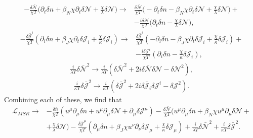 \documentclass[aps,prd,nofootinbib,amsmath,amssymb,showpacs,longbibliography,singlecolumn,superscriptaddress,notitlepage]{revtex4-1}
\theoremstyle{plain}
\theoremstyle{definition}
\begin{document}
\begin{equation}
\begin{split}
    - \frac{\delta \bar{\mathcal{N}}}{\chi T} \bigg( \partial_t \delta n + \beta_N \chi \partial_t \delta \mathcal{N} + \frac{\chi}{\lambda} \delta \mathcal{N} \bigg) \rightarrow & \frac{\delta \bar{\mathcal{N}}}{\chi T} \bigg( -\partial_t \delta n - \beta_N \chi \partial_t \delta \mathcal{N} + \frac{\chi}{\lambda} \delta \mathcal{N} \bigg) + \\
    & - \frac{i\delta \mathcal{N}}{\chi T} \bigg( \partial_t \delta n - \frac{\chi}{\lambda} \delta \mathcal{N} \bigg) ,
\end{split}
\end{equation}
\begin{equation}
\begin{split}
    - \frac{\delta \bar{\mathcal{J}}^i}{\chi T} \left( \partial_i \delta n + \beta_J \chi \partial_t \delta \mathcal{J}_i + \frac{\chi}{\kappa} \delta \mathcal{J}_i \right) \rightarrow & \frac{\delta \bar{\mathcal{J}}^i}{\chi T} \left( -\partial_i \delta n - \beta_J \chi \partial_t \delta \mathcal{J}_i + \frac{\chi}{\kappa} \delta \mathcal{J}_i \right) + \\
    & - \frac{i \delta \mathcal{J}^i}{\chi T} \left( \partial_i \delta n - \frac{\chi}{\kappa} \delta \mathcal{J}_i \right) ,
\end{split}
\end{equation}
\begin{eqnarray}
    \frac{i}{\lambda T} \delta \bar{\mathcal{N}}^2 \rightarrow \frac{i}{\lambda T} \left( \delta \bar{\mathcal{N}}^2 + 2i \delta \bar{\mathcal{N}} \delta \mathcal{N} - \delta \mathcal{N}^2 \right) ,
\end{eqnarray}
\begin{eqnarray}
    \frac{i}{\kappa T} \delta \bar{\mathcal{J}}^2 \rightarrow \frac{i}{\kappa T} \left( \delta \bar{\mathcal{J}}^2 + 2i \delta \bar{\mathcal{J}}_i \delta \mathcal{J}^i - \delta \mathcal{J}^2 \right) .
\end{eqnarray}
Combining each of these, we find that 
\begin{equation}
\begin{split}
    \mathcal{L}_{MSR} \rightarrow & - \frac{\delta \bar{n}}{\chi T} \left( u^{\mu} \partial_{\mu} \delta n + u^{\mu} \partial_{\mu} \delta \mathcal{N} + \partial_{\mu} \delta \mathcal{J}^{\mu} \right) - \frac{\delta \bar{\mathcal{N}}}{\chi T} \bigg( u^{\mu} \partial_{\mu} \delta n + \beta_N \chi u^{\mu} \partial_{\mu} \delta \mathcal{N} + \\
    & + \frac{\chi}{\lambda} \delta \mathcal{N} \bigg) - \frac{\delta \bar{\mathcal{J}}^{\mu}}{\chi T} \left( \partial_{\mu} \delta n + \beta_J \chi u^{\nu} \partial_{\nu} \delta \mathcal{J}_{\mu} + \frac{\chi}{\kappa} \delta \mathcal{J}_{\mu} \right) + \frac{i}{\lambda T} \delta \bar{\mathcal{N}}^2 + \frac{i}{\kappa T} \delta \bar{\mathcal{J}}^2 .
\end{split}
\end{equation}
\end{document}
